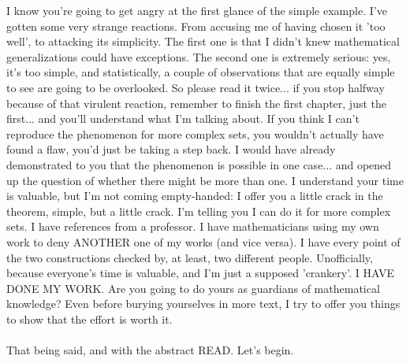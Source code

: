 	\noindent
	I know you're going to get angry at the first glance of the simple example. I've gotten some very strange reactions. From accusing me of having chosen it 'too well', to attacking its simplicity. The first one is that I didn't knew mathematical generalizations could have exceptions. The second one is extremely serious: yes, it's too simple, and statistically, a couple of observations that are equally simple to see are going to be overlooked. So please read it twice... if you stop halfway because of that virulent reaction, remember to finish the first chapter, just the first... and you'll understand what I'm talking about. If you think I can't reproduce the phenomenon for more complex sets, you wouldn't actually have found a flaw, you'd just be taking a step back. I would have already demonstrated to you that the phenomenon is possible in one case... and opened up the question of whether there might be more than one. I understand your time is valuable, but I'm not coming empty-handed: I offer you a little crack in the theorem, simple, but a little crack. I'm telling you I can do it for more complex sets. I have references from a professor. I have mathematicians using my own work to deny ANOTHER one of my works (and vice versa). I have every point of the two constructions checked by, at least, two different people. Unofficially, because everyone's time is valuable, and I'm just a supposed 'crankery'. I HAVE DONE MY WORK. Are you going to do yours as guardians of mathematical knowledge? Even before burying yourselves in more text, I try to offer you things to show that the effort is worth it.\\\\
	
	\noindent
	That being said, and with the abstract READ. Let's begin.\\\\